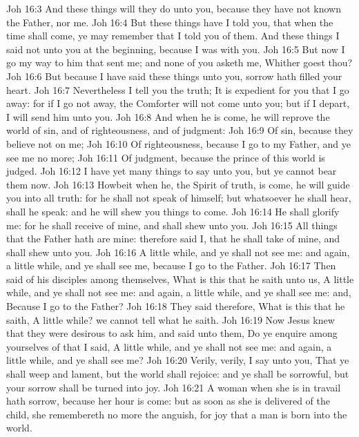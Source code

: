 \vs Joh 16:3 And these things will they do unto you, because they have not known the Father, nor me.
\vs Joh 16:4 But these things have I told you, that when the time shall come, ye may remember that I told you of them. And these things I said not unto you at the beginning, because I was with you.
\vs Joh 16:5 But now I go my way to him that sent me; and none of you asketh me, Whither goest thou?
\vs Joh 16:6 But because I have said these things unto you, sorrow hath filled your heart.
\vs Joh 16:7 Nevertheless I tell you the truth; It is expedient for you that I go away: for if I go not away, the Comforter will not come unto you; but if I depart, I will send him unto you.
\vs Joh 16:8 And when he is come, he will reprove the world of sin, and of righteousness, and of judgment:
\vs Joh 16:9 Of sin, because they believe not on me;
\vs Joh 16:10 Of righteousness, because I go to my Father, and ye see me no more;
\vs Joh 16:11 Of judgment, because the prince of this world is judged.
\vs Joh 16:12 I have yet many things to say unto you, but ye cannot bear them now.
\vs Joh 16:13 Howbeit when he, the Spirit of truth, is come, he will guide you into all truth: for he shall not speak of himself; but whatsoever he shall hear,  shall he speak: and he will shew you things to come.
\vs Joh 16:14 He shall glorify me: for he shall receive of mine, and shall shew  unto you.
\vs Joh 16:15 All things that the Father hath are mine: therefore said I, that he shall take of mine, and shall shew  unto you.
\vs Joh 16:16 A little while, and ye shall not see me: and again, a little while, and ye shall see me, because I go to the Father.
\vs Joh 16:17 Then said  of his disciples among themselves, What is this that he saith unto us, A little while, and ye shall not see me: and again, a little while, and ye shall see me: and, Because I go to the Father?
\vs Joh 16:18 They said therefore, What is this that he saith, A little while? we cannot tell what he saith.
\vs Joh 16:19 Now Jesus knew that they were desirous to ask him, and said unto them, Do ye enquire among yourselves of that I said, A little while, and ye shall not see me: and again, a little while, and ye shall see me?
\vs Joh 16:20 Verily, verily, I say unto you, That ye shall weep and lament, but the world shall rejoice: and ye shall be sorrowful, but your sorrow shall be turned into joy.
\vs Joh 16:21 A woman when she is in travail hath sorrow, because her hour is come: but as soon as she is delivered of the child, she remembereth no more the anguish, for joy that a man is born into the world.
